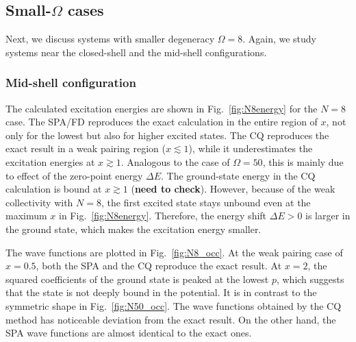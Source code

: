 \documentclass[%
superscriptaddress,
preprint,
showpacs,
nofootinbib,
amsmath,amssymb,
prc,
floatfix ]%
{revtex4-1}
\begin{document}
\subsection{Small-$\Omega$ cases}

Next, we discuss systems with smaller degeneracy $\Omega=8$.
Again, we study systems near the closed-shell and the mid-shell configurations.

\subsubsection{Mid-shell configuration}

The calculated excitation energies are shown in Fig.~\ref{fig:N8energy}
for the $N=8$ case.
The SPA/FD reproduces the exact calculation in the entire region of $x$,
not only for the lowest but also for higher excited states.
The CQ reproduces the exact result in a weak pairing region ($x\lesssim 1$),
while it underestimates the excitation energies at $x\gtrsim 1$.
Analogous to the case of $\Omega=50$,
this is mainly due to effect of the zero-point energy $\Delta E$.
The ground-state energy in the CQ calculation 
is bound at $x\gtrsim 1$ ({\bf need to check}).
However, because of the weak collectivity with $N=8$,
the first excited state stays unbound even at the maximum $x$ in 
Fig.~\ref{fig:N8energy}.
Therefore, the energy shift $\Delta E>0$ is larger in the ground state,
which makes the excitation energy smaller.

The wave functions are plotted in Fig.~\ref{fig:N8_occ}. 
At the weak pairing case of $x=0.5$,
both the SPA and the CQ reproduce the exact result.
At $x=2$, the squared coefficients of the ground state is peaked at the
lowest $p$, which suggests that the state is not deeply bound in the
potential.
It is in contrast to the symmetric shape in Fig.~\ref{fig:N50_occ}.
The wave functions obtained by the CQ method has noticeable deviation
from the exact result.
On the other hand, the SPA wave functions are almost identical to the
exact ones.


\end{document}
